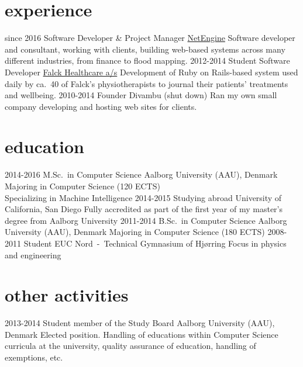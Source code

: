 \documentclass{friggeri-cv}
\newcommand{\aau}{%
  Aalborg University (AAU), Denmark
}
\begin{document}
\section{experience}
\begin{entrylist}
  \entry%
    {since 2016}
    {Software Developer \& Project Manager}
    {\href{http://netengine.com.au/}{NetEngine}}
    {Software developer and consultant, working with clients, building web-based systems across many
    different industries, from finance to flood mapping.}
  \entry%
    {2012-2014}
    {Student Software Developer}
    {\href{http://www.falck.com/en/company/organisation/business-areas/healthcare}{Falck Healthcare a/s}}
    {Development of Ruby on Rails-based system used daily by ca.\ 40 of Falck's physiotherapists to journal their patients' treatments and wellbeing.}
  \entry
    {2010-2014}
    {Founder}
    {Divambu (shut down)}
    {Ran my own small company developing and hosting web sites for clients.}
\end{entrylist}

\section{education}

\begin{entrylist}
  \entry
    {2014-2016}
    {M.Sc.\ {\normalfont in Computer Science}}
    {\aau}
    {Majoring in Computer Science (120 ECTS)\\
    Specializing in Machine Intelligence}
  \entry
    {2014-2015}
    {Studying abroad}
    {University of California, San Diego}
    {Fully accredited as part of the first year of my master's degree from Aalborg University}
  \entry
    {2011-2014}
    {B.Sc.\ {\normalfont in Computer Science}}
    {\aau}
    {Majoring in Computer Science (180 ECTS)}
  \entry
    {2008-2011}
    {Student}
    {EUC Nord~-~Technical Gymnasium of Hjørring}
    {Focus in physics and engineering}
\end{entrylist}

\section{other activities}
\begin{entrylist}
  \entry
    {2013-2014}
    {Student member of the Study Board}
    {\aau}
    {Elected position. Handling of educations within Computer Science curricula at the university, quality assurance of education, handling of exemptions, etc.}
\end{entrylist}
\end{document}
